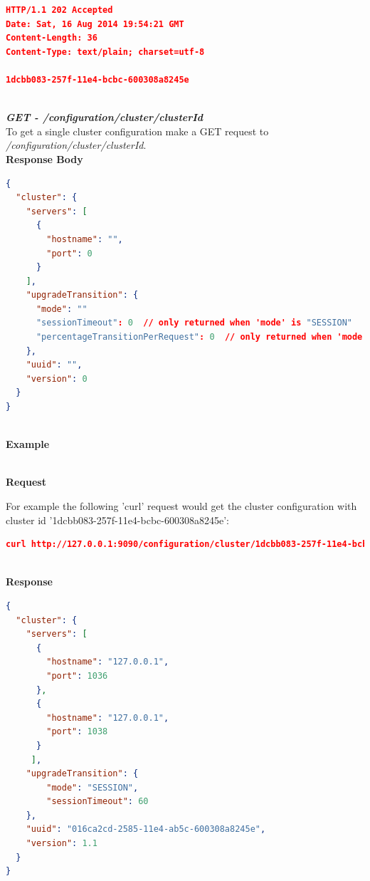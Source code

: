 \documentclass[a4paper,11pt,twoside]{article}
\begin{document}
\begin{lstlisting}[language=json,firstnumber=1]
HTTP/1.1 202 Accepted
Date: Sat, 16 Aug 2014 19:54:21 GMT
Content-Length: 36
Content-Type: text/plain; charset=utf-8
 
1dcbb083-257f-11e4-bcbc-600308a8245e
\end{lstlisting}

\noindent \\
\textit{\textbf{GET - /configuration/cluster/{clusterId}}}\\

\noindent 
To get a single cluster configuration make a GET request to \textit{/configuration/cluster/{clusterId}}.\\ 

\noindent 
\textbf{Response Body}\\

\begin{lstlisting}[language=json,firstnumber=1]
{
  "cluster": {
    "servers": [
      {
        "hostname": "",
        "port": 0
      }
    ],
    "upgradeTransition": {
      "mode": ""
      "sessionTimeout": 0  // only returned when 'mode' is "SESSION" 
      "percentageTransitionPerRequest": 0  // only returned when 'mode' is "GRADUAL"
    },
    "uuid": "",
    "version": 0
  }
} 
\end{lstlisting}

\noindent \\
\textbf{Example}

\noindent \\
\textbf{Request}

\noindent 
For example the following 'curl' request would get the cluster configuration with cluster id '1dcbb083-257f-11e4-bcbc-600308a8245e':\\

\begin{lstlisting}[language=json,firstnumber=1]
curl http://127.0.0.1:9090/configuration/cluster/1dcbb083-257f-11e4-bcbc-600308a8245e -X GET
\end{lstlisting}

\noindent \\
\textbf{Response}\\

\begin{lstlisting}[language=json,firstnumber=1]
{
  "cluster": {
    "servers": [
      {
        "hostname": "127.0.0.1",
        "port": 1036
      },
      {
        "hostname": "127.0.0.1",
        "port": 1038
      }
     ],
    "upgradeTransition": {
        "mode": "SESSION",
        "sessionTimeout": 60
    },
    "uuid": "016ca2cd-2585-11e4-ab5c-600308a8245e",
    "version": 1.1
  }
}
  
\end{lstlisting}
\end{document}
